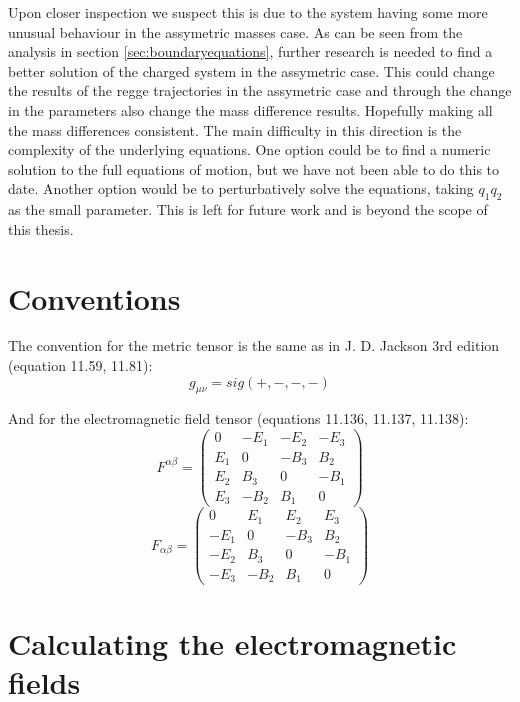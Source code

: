 \documentclass[11pt,a4paper]{article}
\begin{document}
Upon closer inspection we suspect this is due to the system having some more unusual behaviour in the assymetric masses case. As can be seen from the analysis in section \ref{sec:boundaryequations}, further research is needed to find a better solution of the charged system in the assymetric case. This could change the results of the regge trajectories in the assymetric case and through the change in the parameters also change the mass difference results. Hopefully making all the mass differences consistent. The main difficulty in this direction is the complexity of the underlying equations. One option could be to find a numeric solution to the full equations of motion, but we have not been able to do this to date. Another option would be to perturbatively solve the equations, taking $q_1q_2$ as the small parameter. This is left for future work and is beyond the scope of this thesis.
\appendix
\FloatBarrier
\section{Conventions}
The convention for the metric tensor is the same as in J. D. Jackson 3rd edition (equation 11.59, 11.81):
\begin{equation*}
g_{\mu\nu}=sig(+,-,-,-)
\end{equation*}

And for the electromagnetic field tensor (equations 11.136, 11.137, 11.138):
\begin{equation*}
F^{\alpha\beta}=\left(\begin{array}{cccc}
0 & -E_{1} & -E_{2} & -E_{3}\\
E_{1} & 0 & -B_{3} & B_{2}\\
E_{2} & B_{3} & 0 & -B_{1}\\
E_{3} & -B_{2} & B_{1} & 0
\end{array}\right)
\end{equation*}
\begin{equation*}
F_{\alpha\beta}=\left(\begin{array}{cccc}
0 & E_{1} & E_{2} & E_{3}\\
-E_{1} & 0 & -B_{3} & B_{2}\\
-E_{2} & B_{3} & 0 & -B_{1}\\
-E_{3} & -B_{2} & B_{1} & 0
\end{array}\right)
\end{equation*}
\FloatBarrier
\section{Calculating the electromagnetic fields}
\label{sec:EMFields}
\end{document}
